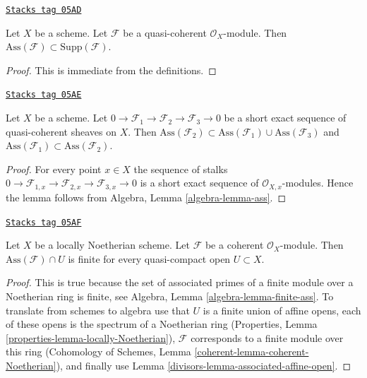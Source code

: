 \begin{lemma}
\label{divisors-lemma-ass-support}
\href{https://stacks.math.columbia.edu/tag/05AD}{\texttt{Stacks tag 05AD}}

Let $X$ be a scheme.
Let $\mathcal{F}$ be a quasi-coherent $\mathcal{O}_X$-module.
Then $\text{Ass}(\mathcal{F}) \subset \text{Supp}(\mathcal{F})$.
\end{lemma}

\begin{proof}
This is immediate from the definitions.
\end{proof}

\begin{lemma}
\label{divisors-lemma-ses-ass}
\href{https://stacks.math.columbia.edu/tag/05AE}{\texttt{Stacks tag 05AE}}

Let $X$ be a scheme.
Let $0 \to \mathcal{F}_1 \to \mathcal{F}_2 \to \mathcal{F}_3 \to 0$
be a short exact sequence of quasi-coherent sheaves on $X$.
Then
$\text{Ass}(\mathcal{F}_2) \subset
\text{Ass}(\mathcal{F}_1) \cup \text{Ass}(\mathcal{F}_3)$
and
$\text{Ass}(\mathcal{F}_1) \subset \text{Ass}(\mathcal{F}_2)$.
\end{lemma}

\begin{proof}
For every point $x \in X$ the sequence of stalks
$0 \to \mathcal{F}_{1, x} \to \mathcal{F}_{2, x} \to \mathcal{F}_{3, x} \to 0$
is a short exact sequence of $\mathcal{O}_{X, x}$-modules.
Hence the lemma follows from
Algebra, Lemma \ref{algebra-lemma-ass}.
\end{proof}

\begin{lemma}
\label{divisors-lemma-finite-ass}
\href{https://stacks.math.columbia.edu/tag/05AF}{\texttt{Stacks tag 05AF}}

Let $X$ be a locally Noetherian scheme.
Let $\mathcal{F}$ be a coherent $\mathcal{O}_X$-module.
Then $\text{Ass}(\mathcal{F}) \cap U$ is finite for
every quasi-compact open $U \subset X$.
\end{lemma}

\begin{proof}

This is true because the set of associated primes of a finite module over
a Noetherian ring is finite, see
Algebra, Lemma \ref{algebra-lemma-finite-ass}.
To translate from schemes to algebra use that $U$ is a finite union of
affine opens, each of these opens is the spectrum of a Noetherian ring
(Properties, Lemma \ref{properties-lemma-locally-Noetherian}),
$\mathcal{F}$ corresponds to a finite module over this ring
(Cohomology of Schemes, Lemma \ref{coherent-lemma-coherent-Noetherian}),
and finally use
Lemma \ref{divisors-lemma-associated-affine-open}.
\end{proof}

